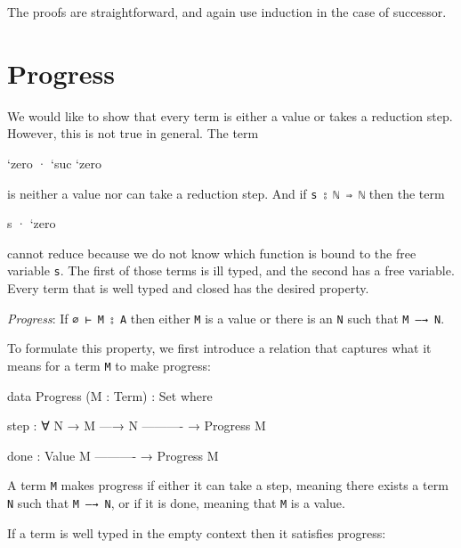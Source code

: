 The proofs are straightforward, and again use induction in the case of
successor.

\hypertarget{progress}{%
\section{Progress}\label{progress}}

We would like to show that every term is either a value or takes a
reduction step. However, this is not true in general. The term

\begin{myDisplay}
`zero · `suc `zero
\end{myDisplay}

is neither a value nor can take a reduction step. And if
\texttt{s\ ⦂\ \textasciigrave{}ℕ\ ⇒\ \textasciigrave{}ℕ} then the term

\begin{myDisplay}
 s · `zero
\end{myDisplay}

cannot reduce because we do not know which function is bound to the free
variable \texttt{s}. The first of those terms is ill typed, and the
second has a free variable. Every term that is well typed and closed has
the desired property.

\emph{Progress}: If \texttt{∅\ ⊢\ M\ ⦂\ A} then either \texttt{M} is a
value or there is an \texttt{N} such that \texttt{M\ —→\ N}.

To formulate this property, we first introduce a relation that captures
what it means for a term \texttt{M} to make progress:

\begin{fence}
\begin{code}
data Progress (M : Term) : Set where

  step : ∀ {N}
    → M —→ N
      ----------
    → Progress M

  done :
      Value M
      ----------
    → Progress M
\end{code}
\end{fence}

A term \texttt{M} makes progress if either it can take a step, meaning
there exists a term \texttt{N} such that \texttt{M\ —→\ N}, or if it is
done, meaning that \texttt{M} is a value.

If a term is well typed in the empty context then it satisfies progress:

